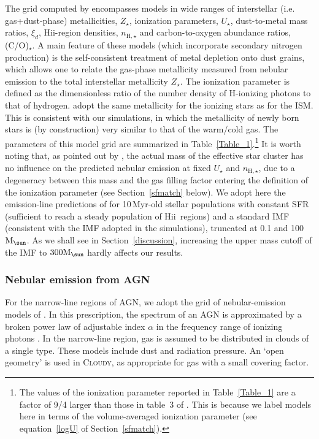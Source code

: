 \documentclass[fleqn,usenatbib]{mnras}
\newcommand{\Msun}{\hbox{M$_\sun$}}
\newcommand{\hii}{\hbox{H{\sc ii}}}
\begin{document}
The grid computed by \citet[][see their table~3]{Gutkin16} encompasses
models in  wide ranges of interstellar (i.e. gas+dust-phase)
metallicities, $Z_{\star}$,  ionization parameters, $U_{\star}$,
dust-to-metal mass ratios, $\xi_d$, \hii-region densities,
$n_{\mathrm{H}, \star}$ and carbon-to-oxygen abundance ratios,
(C/O)$_{\star}$. A main feature of these models (which incorporate
secondary nitrogen production) is the  self-consistent treatment of
metal depletion onto dust grains, which allows one to relate the
gas-phase metallicity measured from nebular emission to the total 
interstellar metallicity $Z_{\star}$. 
The ionization parameter is defined as the dimensionless ratio of 
the number density  of H-ionizing photons to that of
hydrogen. \citet{Gutkin16} adopt the same metallicity for the ionizing
stars as for the ISM. This is consistent with our simulations, in
which the metallicity of newly born stars is (by construction) very
similar to that of the warm/cold gas. The parameters of this model
grid are summarized in Table~\ref{Table_1}.\footnote{ The values of
the ionization parameter reported in Table~\ref{Table_1} are a factor
of 9/4 larger than those in table~3 of \citet{Gutkin16}. This is because 
we label models here in terms of the volume-averaged ionization parameter
(see equation~\ref{logU} of Section~\ref{sfmatch}).} It is worth noting
that, as pointed out by \citet[][see also \citealt{Gutkin16}]{Charlot01}, 
the actual mass of the effective star cluster has no influence on the 
predicted nebular emission at fixed $U_{\star}$ and $n_{\mathrm{H}, \star}$,
due to a degeneracy between this mass and the gas filling factor 
entering the definition of the ionization parameter (see Section~\ref{sfmatch} 
below). We adopt here the
emission-line predictions of \citet{Gutkin16} for 10\,Myr-old stellar
populations with constant SFR (sufficient to reach a steady population 
of \hii\ regions) and a standard \citet{Chabrier03} IMF
(consistent with the IMF adopted in the simulations), truncated at 0.1
and 100 $\Msun$. As we shall see in Section~\ref{discussion},
increasing the upper mass cutoff of the IMF to $300 \Msun$ hardly
affects our results.     

\subsubsection{Nebular emission from AGN}\label{emlines_agn}

For the narrow-line regions of AGN, we adopt the grid of
nebular-emission  models of \citet{Feltre16}. In this prescription,
the spectrum of  an AGN is approximated by a broken power law 
of adjustable index $\alpha$ in the frequency range of ionizing
photons \citep[equation 5 of][]{Feltre16}. In the narrow-line region,
gas is assumed  to be distributed in clouds of a single type. These
models include dust and radiation pressure. An `open geometry' is used
in  \textsc{Cloudy}, as appropriate for gas with a small covering 
factor. 
\end{document}
